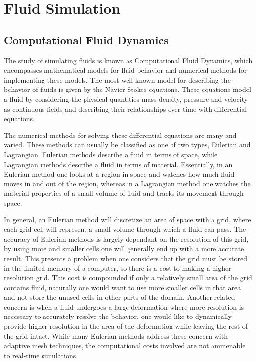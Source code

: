 \chapter{Fluid Simulation}

\section{Computational Fluid Dynamics}

The study of simulating fluids is known as Computational Fluid Dynamics, which
encompasses mathematical models for fluid behavior and numerical methods for
implementing these models. The most well known model for describing the
behavior of fluids is given by the Navier-Stokes equations. These equations
model a fluid by considering the physical quantities mass-density, pressure and
velocity as continuous fields and describing their relationships over time with
differential equations.


The numerical methods for solving these differential equations are many and
varied. These methods can usually be classified as one of two types, Eulerian
and Lagrangian. Eulerian methods describe a fluid in terms of space, while
Lagrangian methods describe a fluid in terms of material. Essentially, in an
Eulerian method one looks at a region in space and watches how much fluid moves
in and out of the region, whereas in a Lagrangian method one watches the
material properties of a small volume of fluid and tracks its movement through
space.


In general, an Eulerian method will discretize an area of space with a grid,
where each grid cell will represent a small volume through which a fluid can
pass. The accuracy of Eulerian methods is largely dependant on the resolution
of this grid, by using more and smaller cells one will generally end up with a
more accurate result. This presents a problem when one considers that the grid
must be stored in the limited memory of a computer, so there is a cost to
making a higher resolution grid. This cost is compounded if only a relatively
small area of the grid contains fluid, naturally one would want to use more
smaller cells in that area and not store the unused cells in other parts of the
domain. Another related concern is when a fluid undergoes a large deformation
where more resolution is necessary to accurately resolve the behavior, one
would like to dynamically provide higher resolution in the area of the
deformation while leaving the rest of the grid intact.
While many Eulerian methods address these concern with adaptive mesh techniques,
the computational costs involved are not ammenable to real-time simulations. 


